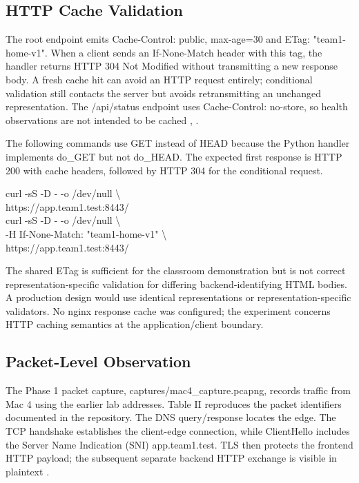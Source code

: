 \documentclass[conference]{IEEEtran}
\begin{document}
\subsection{HTTP Cache Validation}\label{d.-http-cache-validation}

The root endpoint emits Cache-Control: public, max-age=30 and ETag:
"team1-home-v1". When a client sends an If-None-Match header with this
tag, the handler returns HTTP 304 Not Modified without transmitting a
new response body. A fresh cache hit can avoid an HTTP request entirely;
conditional validation still contacts the server but avoids
retransmitting an unchanged representation. The /api/status endpoint
uses Cache-Control: no-store, so health observations are not intended to
be cached \cite{ref7}, \cite{ref8}.

The following commands use GET instead of HEAD because the Python
handler implements do\_GET but not do\_HEAD. The expected first response
is HTTP 200 with cache headers, followed by HTTP 304 for the conditional
request.

curl -sS -D - -o /dev/null \textbackslash{}\\
https://app.team1.test:8443/\\
curl -sS -D - -o /dev/null \textbackslash{}\\
-H \textquotesingle If-None-Match: "team1-home-v1"\textquotesingle{}
\textbackslash{}\\
https://app.team1.test:8443/

The shared ETag is sufficient for the classroom demonstration but is not
correct representation-specific validation for differing
backend-identifying HTML bodies. A production design would use identical
representations or representation-specific validators. No nginx response
cache was configured; the experiment concerns HTTP caching semantics at
the application/client boundary.

\subsection{Packet-Level
Observation}\label{e.-packet-level-observation}

The Phase 1 packet capture, captures/mac4\_capture.pcapng, records
traffic from Mac 4 using the earlier lab addresses. Table II reproduces
the packet identifiers documented in the repository. The DNS
query/response locates the edge. The TCP handshake establishes the
client-edge connection, while ClientHello includes the Server Name
Indication (SNI) app.team1.test. TLS then protects the frontend HTTP
payload; the subsequent separate backend HTTP exchange is visible in
plaintext \cite{ref2}.
\end{document}
